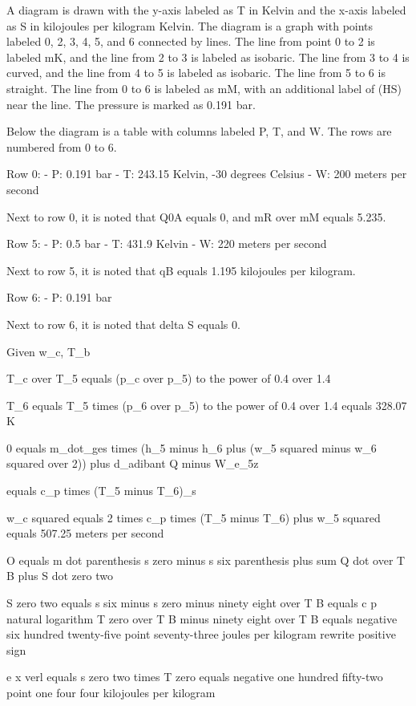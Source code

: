 A diagram is drawn with the y-axis labeled as T in Kelvin and the x-axis labeled as S in kilojoules per kilogram Kelvin. The diagram is a graph with points labeled 0, 2, 3, 4, 5, and 6 connected by lines. The line from point 0 to 2 is labeled mK, and the line from 2 to 3 is labeled as isobaric. The line from 3 to 4 is curved, and the line from 4 to 5 is labeled as isobaric. The line from 5 to 6 is straight. The line from 0 to 6 is labeled as mM, with an additional label of (HS) near the line. The pressure is marked as 0.191 bar.

Below the diagram is a table with columns labeled P, T, and W. The rows are numbered from 0 to 6.

Row 0: 
- P: 0.191 bar
- T: 243.15 Kelvin, -30 degrees Celsius
- W: 200 meters per second

Next to row 0, it is noted that Q0A equals 0, and mR over mM equals 5.235.

Row 5: 
- P: 0.5 bar
- T: 431.9 Kelvin
- W: 220 meters per second

Next to row 5, it is noted that qB equals 1.195 kilojoules per kilogram.

Row 6: 
- P: 0.191 bar

Next to row 6, it is noted that delta S equals 0.

Given w_c, T_b

T_c over T_5 equals (p_c over p_5) to the power of 0.4 over 1.4

T_6 equals T_5 times (p_6 over p_5) to the power of 0.4 over 1.4 equals 328.07 K

0 equals m_dot_ges times (h_5 minus h_6 plus (w_5 squared minus w_6 squared over 2)) plus d_adibant Q minus W_e_5z

equals c_p times (T_5 minus T_6)_s

w_c squared equals 2 times c_p times (T_5 minus T_6) plus w_5 squared equals 507.25 meters per second

O equals m dot parenthesis s zero minus s six parenthesis plus sum Q dot over T B plus S dot zero two

S zero two equals s six minus s zero minus ninety eight over T B equals c p natural logarithm T zero over T B minus ninety eight over T B equals negative six hundred twenty-five point seventy-three joules per kilogram rewrite positive sign

e x verl equals s zero two times T zero equals negative one hundred fifty-two point one four four kilojoules per kilogram